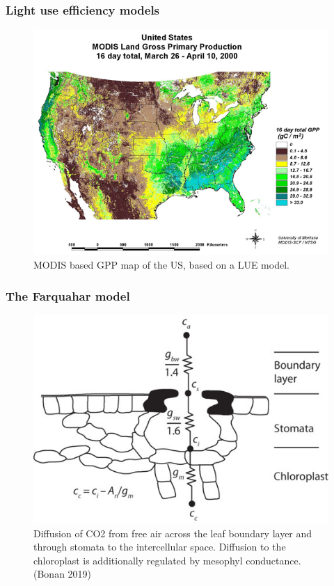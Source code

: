 \documentclass[
  oneside]{book}
\begin{document}
\hypertarget{light-use-efficiency-models}{%
\subsubsection{Light use efficiency models}\label{light-use-efficiency-models}}

\begin{figure}

{\centering \includegraphics[width=0.8\linewidth]{figures/chap2/MODIS_GPP} 

}

\caption{MODIS based GPP map of the US, based on a LUE model.}\label{fig:f26}
\end{figure}

\hypertarget{the-farquahar-model}{%
\subsubsection{The Farquahar model}\label{the-farquahar-model}}

\begin{figure}

{\centering \includegraphics[width=0.8\linewidth]{figures/chap2/conductance} 

}

\caption{Diffusion of CO2 from free air across the leaf boundary layer and through stomata to the intercellular space. Diffusion to the chloroplast is additionally regulated by mesophyl conductance. (Bonan 2019)}\label{fig:f27}
\end{figure}
\end{document}
